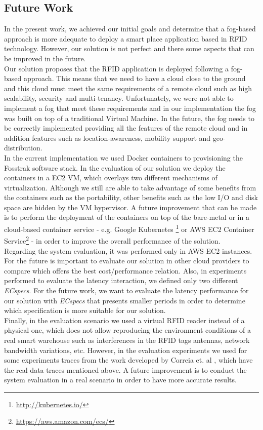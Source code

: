 \subsection{Future Work}
\label{sub:future_work}
In the present work, we achieved our initial goals and determine that a fog-based approach is more
adequate to deploy a smart place application based in \gls{RFID} technology. However, our solution
is not perfect and there some aspects that can be improved in the future.\\

Our solution proposes that the \gls{RFID} application is deployed following a fog-based approach.
This means that we need to have a cloud close to the ground and this cloud must meet the same
requirements of a remote cloud such as high scalability, security and multi-tenancy. Unfortunately,
we were not able to implement a fog that meet these requirements and in our implementation the fog
was built on top of a traditional Virtual Machine. In the future, the fog needs to be correctly
implemented providing all the features of the remote cloud and in addition features such as
location-awareness, mobility support and geo-distribution.\\

In the current implementation we used Docker containers to provisioning the Fosstrak software stack.
In the evaluation of our solution we deploy the containers in a \gls{EC2} \gls{VM}, which overlays two
different mechanisms of virtualization. Although we still are able to take advantage of some benefits
from the containers such as the portability, other benefits such as the low I/O and disk space are
hidden by the \gls{VM} hypervisor. A future improvement that can be made is to perform the deployment
of the containers on top of the bare-metal or in a cloud-based container service - e.g. Google Kubernetes
\footnote{\url{http://kubernetes.io/}} or \gls{AWS} \gls{EC2} Container Service\footnote{\url{https://aws.amazon.com/ecs/}} -
in order to improve the overall performance of the solution.\\

Regarding the system evaluation, it was performed only in \gls{AWS} \gls{EC2} instances. For the future
is important to evaluate our solution in other cloud providers to compare which offers the best cost/performance
relation. Also, in experiments performed to evaluate the latency interaction, we defined only two
different \textit{ECspecs}. For the future work, we want to evaluate the latency performance for
our solution with \textit{ECspecs} that presents smaller periods in order to determine which
specification is more suitable for our solution.\\

Finally, in the evaluation scenario we used a virtual RFID reader instead of a physical one, which
does not allow reproducing the environment conditions of a real smart warehouse such as interferences
in the RFID tags antennas, network bandwidth variations, etc. However, in the evaluation experiments
we used for some experiments traces from the work developed by Correia et. al \cite{Correia:Thesis:2014},
which have the real data traces mentioned above. A future improvement is to conduct the system evaluation
in a real scenario in order to have more accurate results.
